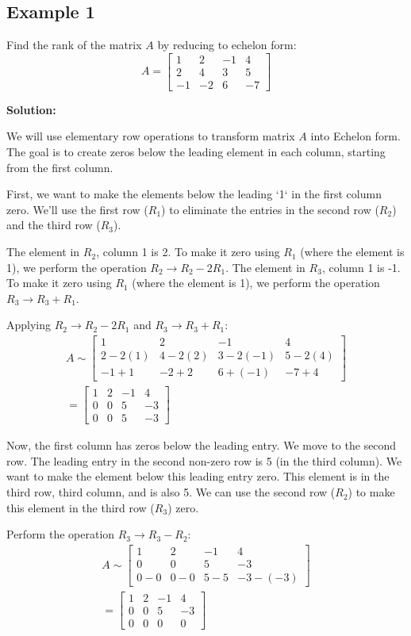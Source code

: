 \documentclass{article}
\begin{document}
\subsection{Example 1}
Find the rank of the matrix $A$ by reducing to echelon form:
\[ A = \begin{bmatrix} 1 & 2 & -1 & 4 \\ 2 & 4 & 3 & 5 \\ -1 & -2 & 6 & -7 \end{bmatrix} \]

\textbf{Solution:}

We will use elementary row operations to transform matrix $A$ into Echelon form. The goal is to create zeros below the leading element in each column, starting from the first column.

First, we want to make the elements below the leading `1` in the first column zero. We'll use the first row ($R_1$) to eliminate the entries in the second row ($R_2$) and the third row ($R_3$).

The element in $R_2$, column 1 is 2. To make it zero using $R_1$ (where the element is 1), we perform the operation $R_2 \to R_2 - 2R_1$.
The element in $R_3$, column 1 is -1. To make it zero using $R_1$ (where the element is 1), we perform the operation $R_3 \to R_3 + R_1$.

Applying $R_2 \to R_2 - 2R_1$ and $R_3 \to R_3 + R_1$:
\begin{align*} A \sim \begin{bmatrix} 1 & 2 & -1 & 4 \\ 2 - 2(1) & 4 - 2(2) & 3 - 2(-1) & 5 - 2(4) \\ -1 + 1 & -2 + 2 & 6 + (-1) & -7 + 4 \end{bmatrix} \\ = \begin{bmatrix} 1 & 2 & -1 & 4 \\ 0 & 0 & 5 & -3 \\ 0 & 0 & 5 & -3 \end{bmatrix}\end{align*}

Now, the first column has zeros below the leading entry. We move to the second row. The leading entry in the second non-zero row is 5 (in the third column). We want to make the element below this leading entry zero. This element is in the third row, third column, and is also 5. We can use the second row ($R_2$) to make this element in the third row ($R_3$) zero.

Perform the operation $R_3 \to R_3 - R_2$:
\begin{align*} A \sim \begin{bmatrix} 1 & 2 & -1 & 4 \\ 0 & 0 & 5 & -3 \\ 0 - 0 & 0 - 0 & 5 - 5 & -3 - (-3) \end{bmatrix} \\ = \begin{bmatrix} 1 & 2 & -1 & 4 \\ 0 & 0 & 5 & -3 \\ 0 & 0 & 0 & 0 \end{bmatrix}\end{align*}
\end{document}
